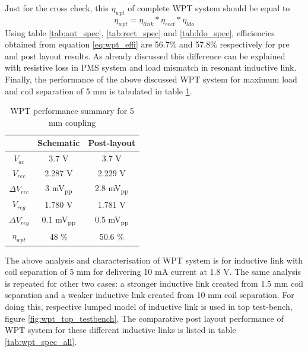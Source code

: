 \documentclass[12pt,a4paper,UKenglish]{report}
\begin{document}
Just for the cross check, this $\eta_{wpt}$ of complete WPT system should be equal to 
\begin{equation} \label{eq:wpt_effi} 
\eta_{wpt} = \eta_{link}*\eta_{rect}*\eta_{ldo}
\end{equation}
Using table \ref{tab:ant_spec}, \ref{tab:rect_spec} and \ref{tab:ldo_spec}, efficiencies obtained from equation \ref{eq:wpt_effi} 
are 56.7\% and 57.8\% respectively for pre and post layout results. As already discussed this difference can be explained with resistive loss
 in PMS system and load mismatch in resonant inductive link.\\

Finally, the performance of the above discussed WPT system for maximum load and coil separation of 5 mm is tabulated in 
table \ref{tab:wpt_spec}. 


\begin{table}[H]
\caption{WPT performance summary for 5 mm coupling} 
\begin{center}
\begin{tabular}{c|c|c}
\hline \hline
					& \textbf{Schematic}	& \textbf{Post-layout} 	\\
\hline \hline
$V_{ac}$			& 3.7 \si{\volt}		& 3.7 \si{\volt} \\ \hline
$V_{rec}$ 			& 2.287 \si{\volt}		& 2.229 V	\\ \hline
$\Delta V_{rec}$	& 3 \si{\milli\volt}\textsubscript{pp} & 2.8 \si{\milli\volt}\textsubscript{pp}		\\ \hline
$V_{reg}$			& 1.780	\si{\volt}		& 1.781 \si{\volt}			\\ \hline
$\Delta V_{reg}$ 	& 0.1 \si{\milli\volt}\textsubscript{pp} & 0.5 \si{\milli\volt}\textsubscript{pp}		\\ \hline
$\eta_{wpt}$		& 48 \%				& 50.6 \%		\\ 
 
\hline \hline
\end{tabular}
\end{center}
\label{tab:wpt_spec}
\end{table}%

The above analysis and characterisation of WPT system is for inductive link with coil separation of 5 mm for delivering 10 mA current at 1.8 V. The 
same analysis is repeated for other two cases: a stronger inductive link created from 1.5 mm coil separation and a weaker inductive link 
created from 10 mm coil separation. For doing this, respective lumped model of inductive link is used in top test-bench, 
figure \ref{fig:wpt_top_testbench}, The comparative post layout performance of WPT system for these different inductive links is listed in 
table \ref{tab:wpt_spec_all}.
\end{document}
